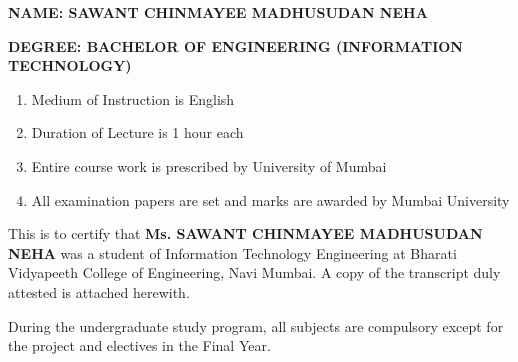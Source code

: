 \documentclass{article} %
\begin{document}


\noindent 

\noindent 

\noindent 

\noindent 

\noindent 

\noindent 

\noindent \textbf{\underbar{}}

\noindent \textbf{\underbar{}}

\noindent \textbf{\underbar{}}

\noindent \textbf{\underbar{}}

\noindent \textbf{}

\noindent \textbf{\underbar{}}

\noindent \textbf{}

\noindent \textbf{\underbar{}}

\noindent \textbf{NAME: SAWANT CHINMAYEE MADHUSUDAN NEHA}

\noindent \textbf{}

\noindent \textbf{DEGREE: BACHELOR OF ENGINEERING (INFORMATION TECHNOLOGY)}

\noindent 

\begin{enumerate}
\item  Medium of Instruction is English

\item  Duration of Lecture is 1 hour each

\item  Entire course work is prescribed by University of Mumbai

\item  All examination papers are set and marks are awarded by Mumbai University
\end{enumerate}

\noindent 

\noindent 

\noindent This is to certify that \textbf{Ms. SAWANT CHINMAYEE MADHUSUDAN NEHA} was a student of Information Technology Engineering at Bharati Vidyapeeth College of Engineering, Navi Mumbai. A copy of the transcript duly attested is attached herewith.

\noindent 

\noindent During the undergraduate study program, all subjects are compulsory except for the project and electives in the Final Year.
\end{document}
